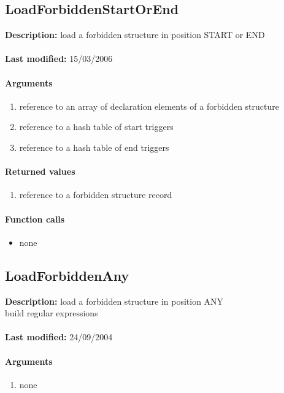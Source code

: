 \subsection{LoadForbiddenStartOrEnd}
\textbf{Description:} load a forbidden structure in position START or END\\
\\\textbf{Last modified:} 15/03/2006

\paragraph{Arguments}
\begin{enumerate}
\item reference to an array of declaration elements of a forbidden structure
\item reference to a hash table of start triggers
\item reference to a hash table of end triggers
\end{enumerate}

\paragraph{Returned values}
\begin{enumerate}
\item reference to a forbidden structure record
\end{enumerate}

\paragraph{Function calls}
\begin{itemize}
\item none
\end{itemize}

\subsection{LoadForbiddenAny}
\textbf{Description:} load a forbidden structure in position ANY\\
build regular expressions\\
\\\textbf{Last modified:} 24/09/2004

\paragraph{Arguments}
\begin{enumerate}
\item none
\end{enumerate}

